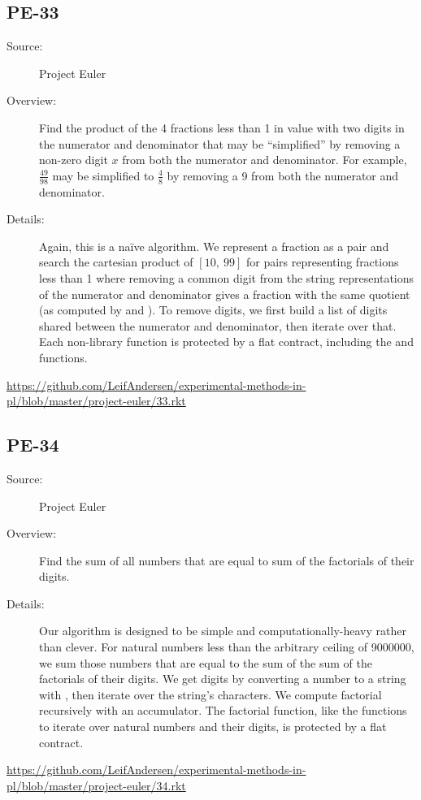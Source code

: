 \subsection*{PE-33~\hrulefill}
\begin{description}
\item[Source:] Project Euler
\item[Overview:]
  Find the product of the 4 fractions less than 1 in value with two digits in the numerator and denominator that may be ``simplified'' by removing a non-zero digit $x$ from both the numerator and denominator.
  For example, $\frac{49}{98}$ may be simplified to $\frac{4}{8}$ by removing a 9 from both the numerator and denominator.
\item[Details:] 
  Again, this is a na\"ive algorithm.
  We represent a fraction as a  pair and search the cartesian product of $[10,~99]$ for pairs representing fractions less than 1 where removing a common digit from the string representations of the numerator and denominator gives a fraction with the same quotient (as computed by \mono{/} and ).
  To remove digits, we first build a list of digits shared between the numerator and denominator, then iterate over that.
  Each non-library function is protected by a flat contract, including the  and  functions.
\end{description}
\url{https://github.com/LeifAndersen/experimental-methods-in-pl/blob/master/project-euler/33.rkt}

\subsection*{PE-34~\hrulefill}
\begin{description}
\item[Source:] Project Euler
\item[Overview:]
  Find the sum of all numbers that are equal to sum of the factorials of their digits.
\item[Details:] 
  Our algorithm is designed to be simple and computationally-heavy rather than clever.
  For natural numbers less than the arbitrary ceiling of 9000000, we sum those numbers that are equal to the sum of the sum of the factorials of their digits.
  We get digits by converting a number to a string with , then iterate over the string's characters.
  We compute factorial recursively with an accumulator.
  The factorial function, like the functions to iterate over natural numbers and their digits, is protected by a flat contract.
\end{description}
\url{https://github.com/LeifAndersen/experimental-methods-in-pl/blob/master/project-euler/34.rkt}

